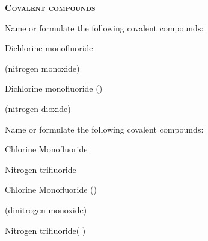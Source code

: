 \documentclass[main.tex]{subfiles}
\begin{document}
\begin{multicols*}{2}
{\raggedright\textsc{\textbf{Covalent compounds}}\par}

\begin{question}[ID=\the\value{numA}]
Name or formulate the following covalent compounds:
\begin{inparaenum}[(a)]
\item {}				%
\item Dichlorine monofluoride	%
\item {}				%
\end{inparaenum}
\end{question}
\begin{solution}
\begin{inparaenum}[(a)]
\item {}	 (nitrogen monoxide)
\item Dichlorine monofluoride	()
\item {}		(nitrogen dioxide)
\end{inparaenum}\hspace{0.1cm}\end{solution}


\begin{question}[ID=\the\value{numA}]
Name or formulate the following covalent compounds:
\begin{inparaenum}[(a)]
\item Chlorine Monofluoride	%
\item {}				%
\item Nitrogen trifluoride		%
\end{inparaenum}
\end{question}
\begin{solution}
\begin{inparaenum}[(a)]
\item Chlorine Monofluoride	()
\item {}		(dinitrogen monoxide)
\item Nitrogen trifluoride(	)
\end{inparaenum}\hspace{0.1cm}\end{solution}





\end{multicols*}
\end{document}
